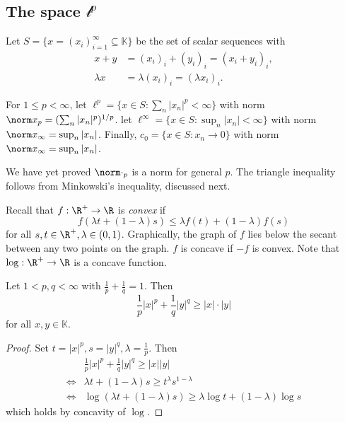 \documentclass[a4paper]{article}
\newcommand{\K}{{\mathbb{K}}} %
\begin{document}
\subsection{The space \(\mathcal l^p\)}

Let \(S = \{x = (x_i)_{i = 1}^\infty \subseteq \K\}\) be the set of scalar sequences with
\begin{align*}
  x + y &= (x_i)_i + (y_i)_i = (x_i + y_i)_i, \\
  \lambda x &= \lambda (x_i)_i = (\lambda x_i)_i.
\end{align*}

\begin{definition}
  For \(1 \leq p < \infty\), let \(\ell^p = \{x \in S: \sum_n |x_n|^p < \infty\}\) with norm \(\norm x_p = (\sum_n |x_n|^p)^{1/p}\). let \(\ell^\infty = \{x \in S: \sup_n |x_n| < \infty\}\) with norm \(\norm x_\infty = \sup_n |x_n|\). Finally, \(c_0 = \{x \in S: x_n \to 0\}\) with norm \(\norm x_\infty = \sup_n |x_n|\).
\end{definition}

We have yet proved \(\norm \cdot_p\) is a norm for general \(p\). The triangle inequality follows from Minkowski's inequality, discussed next.

Recall that \(f: \R^+ \to \R\) is \emph{convex} if
\[
  f(\lambda t + (1 - \lambda) s) \leq \lambda f(t) + (1 - \lambda) f(s)
\]
for all \(s, t \in \R^+, \lambda \in (0, 1)\). Graphically, the graph of \(f\) lies below the secant between any two points on the graph. \(f\) is concave if \(-f\) is convex. Note that \(\log: \R^+ \to \R\) is a concave function.

\begin{corollary}
  Let \(1 < p, q < \infty\) with \(\frac{1}{p} + \frac{1}{q} = 1\). Then
  \[
    \frac{1}{p} |x|^p + \frac{1}{q} |y|^q \geq |x| \cdot |y|
  \]
  for all \(x, y \in \K\).
\end{corollary}

\begin{proof}
  Set \(t = |x|^p, s = |y|^q, \lambda = \frac{1}{p}\). Then
  \begin{align*}
    &\frac{1}{p} |x|^p + \frac{1}{q} |y|^q \geq |x| |y| \\
    \iff& \lambda t + (1 - \lambda) s \geq t^\lambda s^{1 - \lambda} \\
    \iff& \log (\lambda t + (1 - \lambda) s) \geq \lambda \log t + (1 - \lambda) \log s
  \end{align*}
  which holds by concavity of \(\log\).
\end{proof}
\end{document}
